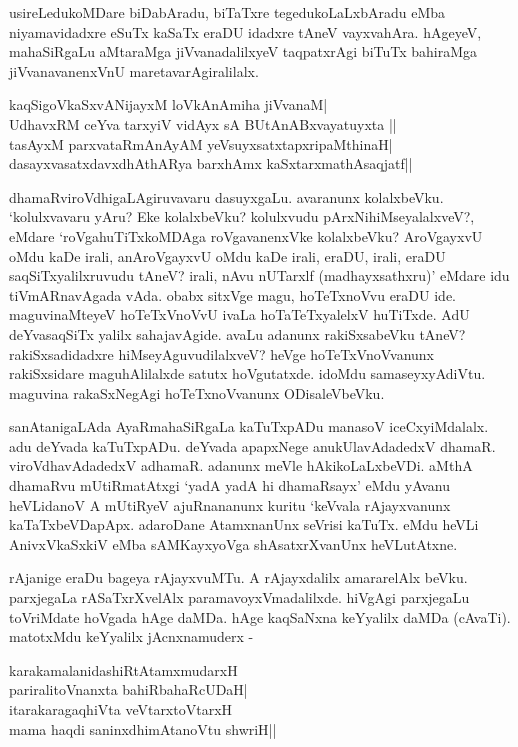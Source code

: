 usireLedukoMDare biDabAradu, biTaTxre tegedukoLaLxbAradu eMba niyamavidadxre eSuTx kaSaTx eraDU idadxre tAneV vayxvahAra. hAgeyeV, mahaSiRgaLu aMtaraMga jiVvanadalilxyeV taqpatxrAgi biTuTx bahiraMga jiVvanavanenxVnU maretavarAgiralilalx.

\begin{shloka}
kaqSigoVkaSxvANijayxM loVkAnAmiha jiVvanaM|\label{225a}\\
UdhavxRM ceYva tarxyiV vidAyx sA‌ BUtAnABxvayatuyxta ||\\
tasAyxM parxvataRmAnAyAM yeVsuyxsatxtapxripaMthinaH|\\
dasayxvasatxdavxdhAthARya barxhAmx kaSxtarxmathAsaqjatf||
\end{shloka}
dhamaRviroVdhigaLAgiruvavaru dasuyxgaLu. avaranunx kolalxbeVku. `kolulxvavaru yAru? Eke kolalxbeVku? kolulxvudu pArxNihiMseyalalxveV?, eMdare `roVgahuTiTxkoMDAga roVgavanenxVke kolalxbeVku? AroVgayxvU oMdu kaDe irali, anAroVgayxvU oMdu kaDe irali, eraDU, irali, eraDU saqSiTxyalilxruvudu tAneV? irali, nAvu nUTarxlf (madhayxsathxru)' eMdare idu tiVmARnavAgada vAda. obabx sitxVge magu, hoTeTxnoVvu eraDU ide. maguvinaMteyeV hoTeTxVnoVvU ivaLa hoTaTeTxyalelxV huTiTxde. AdU deYvasaqSiTx yalilx sahajavAgide. avaLu adanunx rakiSxsabeVku tAneV? rakiSxsadidadxre hiMseyAguvudilalxveV? heVge hoTeTxVnoVvanunx rakiSxsidare maguhAlilalxde satutx hoVgutatxde. idoMdu samaseyxyAdiVtu. maguvina rakaSxNegAgi hoTeTxnoVvanunx ODisaleVbeVku.

sanAtanigaLAda AyaRmahaSiRgaLa kaTuTxpADu manasoV iceCxyiMdalalx. adu deYvada kaTuTxpADu. deYvada apapxNege anukUlavAdadedxV dhamaR. viroVdhavAdadedxV adhamaR. adanunx meVle hAkikoLaLxbeVDi. aMthA dhamaRvu mUtiRmatAtxgi `yadA yadA hi dhamaRsayx'\label{226a} eMdu yAvanu heVLidanoV A mUtiRyeV ajuRnananunx kuritu `keVvala rAjayxvanunx kaTaTxbeVDapApx. adaroDane AtamxnanUnx seVrisi kaTuTx. eMdu heVLi AnivxVkaSxkiV eMba sAMKayxyoVga shAsatxrXvanUnx heVLutAtxne.

rAjanige eraDu bageya rAjayxvuMTu. A rAjayxdalilx amararelAlx beVku. parxjegaLa rASaTxrXvelAlx paramavoyxVmadalilxde. hiVgAgi parxjegaLu toVriMdate hoVgada hAge daMDa. hAge kaqSaNxna keYyalilx daMDa (cAvaTi). matotxMdu keYyalilx jAcnxnamuderx -

\begin{shloka}
karakamalanidashiRtAtamxmudarxH\label{226}\\
pariralitoVnanxta bahiRbahaRcUDaH|\\
itarakaragaqhiVta veVtarxtoVtarxH\\
mama haqdi saninxdhimAtanoVtu shwriH||
\end{shloka}

